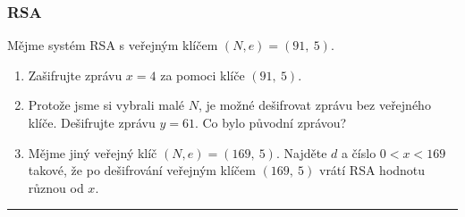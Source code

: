 \documentclass[10pt,a4paper]{article}
\newcommand{\hr}{{\begin{center}\par\rule{\textwidth}{0.5pt} \end{center}}}
\begin{document}
\subsubsection{RSA}
Mějme systém RSA s veřejným klíčem $(N, e)=(91, ~5)$.
\begin{enumerate}[label=(\alph*)]
    \item Zašifrujte zprávu $x=4$ za pomoci klíče $(91, ~5)$.
    \item Protože jsme si vybrali malé $N$, je možné dešifrovat zprávu bez veřejného klíče. Dešifrujte zprávu $y=61$. Co bylo původní zprávou?
    \item Mějme jiný veřejný klíč $(N, e) = (169, ~5)$. Najděte $d$ a číslo $0<x<169$ takové, že po dešifrování veřejným klíčem $(169, ~5)$ vrátí RSA hodnotu různou od $x$.
\end{enumerate}

\hr
\end{document}
